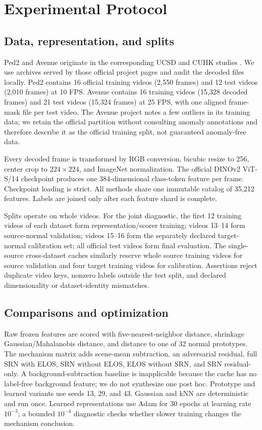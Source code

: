 \section{Experimental Protocol}
\label{sec:protocol}

\subsection{Data, representation, and splits}

Ped2 and Avenue originate in the corresponding UCSD and CUHK studies \citep{li2014anomaly,lu2013abnormal}. We use archives served by those official project pages and audit the decoded files locally. Ped2 contains 16 official training videos (2,550 frames) and 12 test videos (2,010 frames) at 10 FPS. Avenue contains 16 training videos (15,328 decoded frames) and 21 test videos (15,324 frames) at 25 FPS, with one aligned frame-mask file per test video. The Avenue project notes a few outliers in its training data; we retain the official partition without consulting anomaly annotations and therefore describe it as the official training split, not guaranteed anomaly-free data.

Every decoded frame is transformed by RGB conversion, bicubic resize to 256, center crop to $224\times224$, and ImageNet normalization. The official DINOv2 ViT-S/14 checkpoint \citep{oquab2024dinov2} produces one 384-dimensional class-token feature per frame. Checkpoint loading is strict. All methods share one immutable catalog of 35,212 features. Labels are joined only after each feature shard is complete.

Splits operate on whole videos. For the joint diagnostic, the first 12 training videos of each dataset form representation/scorer training; videos 13--14 form source-normal validation; videos 15--16 form the separately declared target-normal calibration set; all official test videos form final evaluation. The single-source cross-dataset caches similarly reserve whole source training videos for source validation and four target training videos for calibration. Assertions reject duplicate video keys, nonzero labels outside the test split, and declared dimensionality or dataset-identity mismatches.

\subsection{Comparisons and optimization}

Raw frozen features are scored with five-nearest-neighbor distance, shrinkage Gaussian/Mahalanobis distance, and distance to one of 32 normal prototypes. The mechanism matrix adds scene-mean subtraction, an adversarial residual, full SRN with ELOS, SRN without ELOS, ELOS without SRN, and SRN residual-only. A background-subtraction baseline is inapplicable because the cache has no label-free background feature; we do not synthesize one post hoc. Prototype and learned variants use seeds 13, 29, and 43. Gaussian and kNN are deterministic and run once. Learned representations use Adam for 30 epochs at learning rate $10^{-3}$; a bounded $10^{-4}$ diagnostic checks whether slower training changes the mechanism conclusion.

